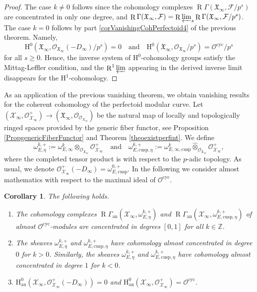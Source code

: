 \documentclass[JEP,XML,SOM,Unicode,published]{cedram}
\newcommand{\quand}{\quad\text{and}\quad}
\newcommand{\an}{\mathrm{an}}
\newcommand{\cusp}{\mathrm{cusp}}
\newcommand{\cyc}{\mathrm{cyc}}
\newcommand{\wotimes}{\mathbin{\widehat\otimes}}
\numberwithin{equation}{section}
\newtheorem{cor}[prop]{Corollary}
\theoremstyle{definition}
\newcommand{\bb}[1]{\mathbb{#1}}
\newcommand{\n}[1]{\mathcal{#1}}
\newcommand{\f}[1]{\mathfrak{#1}}
\newcommand{\s}[1]{\mathscr{#1}}
\DeclareMathOperator{\R}{R}
\begin{document}
\begin{proof}
The case $k\neq 0$ follows since the cohomology complexes $\R\Gamma(\f{X}_{\infty}, \n{F}/p^s)$ are concentrated in only one degree, and $\R \Gamma(\f{X}_{\infty},\n{F})=\R \varprojlim_s \R\Gamma(\f{X}_{\infty}, \n{F}/p^s)$. The case $k=0$ follows by part \eqref{corVanishingCohPerfectoid4} of the previous theorem. Namely,
\[
\mathrm{H}^0(\f{X}_{\infty}, \s{O}_{\f{X}_{\infty}}(-D_{\infty})/p^s)=0\quand\mathrm{H}^0(\f{X}_{\infty}, \s{O}_{\f{X}_{\infty}}/p^s)=\n{O}^{\cyc}/p^s
\]
for all $s\geq 0$. Hence, the inverse system of $\mathrm{H}^0$-cohomology groups satisfy the Mittag-Leffler condition, and the $\R^1 \varprojlim$ appearing in the derived inverse limit disappears for the $\mathrm{H}^1$-cohomology.
\end{proof}

As an application of the previous vanishing theorem, we obtain vanishing results for the coherent cohomology of the perfectoid modular curve. Let $(\n{X}_{\infty}, \s{O}_{\n{X}_{\infty}}^+)\to (\f{X}_{\infty}, \s{O}_{\s{O}_{X_{\infty}}})$ be the natural map of locally and topologically ringed spaces provided by the generic fiber functor, see Proposition \ref{PropgenericFiberFunctor} and Theorem \ref{theoexistperfint}. We define
\[
\omega^{k,+}_{E,\eta}:= \omega_{E,\infty}^k \otimes_{\s{O}_{\f{X}_{\infty}}} \s{O}_{\n{X}_{\infty}}^+\quand\omega^{k,+}_{E,\cusp,\eta}:=\omega_{E,\infty,\cusp}^k\wotimes_{\s{O}_{\f{X}_{\infty}}} \s{O}_{\n{X}_{\infty}}^+,
\]
where the completed tensor product is with respect to the $p$-adic topology. As usual, we denote $\s{O}_{\n{X}_{\infty}}^+(-D_{\infty})= \omega_{E,\cusp}^{0,+}$. In the following we consider almost mathematics with respect to the maximal ideal of $\n{O}^{\cyc}$.

\begin{cor}
\label{CoroCoherentPerfCurve}
The following holds.

\begin{enumerate}
\item The cohomology complexes $\R\Gamma_{\an}(\n{X}_{\infty}, \omega_{E,\eta}^{k,+})$ and $\R\Gamma_{\an}(\n{X}_{\infty}, \omega_{E,\cusp,\eta}^{k,+})$ of \hbox{almost} $\n{O}^{\cyc}$-modules are concentrated in degrees $[0,1]$ for all $k\in \bb{Z}$.

\item The sheaves $\omega_{E,\eta}^{k,+}$ and $\omega_{E,\cusp,\eta}^{k,+}$ have cohomology almost concentrated in degree $0$ for $k>0$. Similarly, the sheaves $\omega_{E,\eta}^{k,+}$ and $\omega_{E,\cusp,\eta}^{k,+}$ have cohomology almost concentrated in degree $1$ for $k<0$.

\item $\mathrm{H}_{\an}^0(\n{X}_{\infty}, \s{O}_{\n{X}_{\infty}}^+(-D_{\infty}))= 0$ and $\mathrm{H}_{\an}^0(\n{X}_{\infty}, \s{O}_{\n{X}_{\infty}}^+)= \n{O}^{\cyc} $.
\end{enumerate}
\end{cor}
\end{document}
